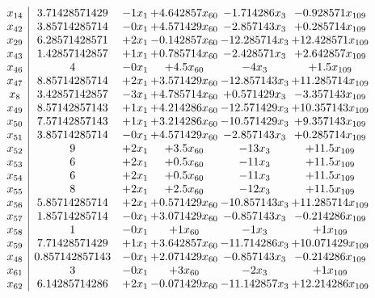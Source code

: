 \documentclass[11pt]{article}
\begin{document}
\[\begin{array}{c| c c@{\hskip 2pt} c@{\hskip 2pt} c@{\hskip 2pt} c@{\hskip 2pt} }
 x_{14}   &  3.71428571429 & -1 x_{1} & + 4.642857 x_{60} & -1.714286 x_{3} & -0.928571 x_{109}\\
 x_{42}   &  3.85714285714 & -0 x_{1} & + 4.571429 x_{60} & -2.857143 x_{3} & + 0.285714 x_{109}\\
 x_{29}   &  6.28571428571 & + 2 x_{1} & -0.142857 x_{60} & -12.285714 x_{3} & + 12.428571 x_{109}\\
 x_{43}   &  1.42857142857 & + 1 x_{1} & + 0.785714 x_{60} & -2.428571 x_{3} & + 2.642857 x_{109}\\
 x_{46}   &  4 & -0 x_{1} & + 4.5 x_{60} & -4 x_{3} & + 1.5 x_{109}\\
 x_{47}   &  8.85714285714 & + 2 x_{1} & + 3.571429 x_{60} & -12.857143 x_{3} & + 11.285714 x_{109}\\
 x_{8}   &  3.42857142857 & -3 x_{1} & + 4.785714 x_{60} & + 0.571429 x_{3} & -3.357143 x_{109}\\
 x_{49}   &  8.57142857143 & + 1 x_{1} & + 4.214286 x_{60} & -12.571429 x_{3} & + 10.357143 x_{109}\\
 x_{50}   &  7.57142857143 & + 1 x_{1} & + 3.214286 x_{60} & -10.571429 x_{3} & + 9.357143 x_{109}\\
 x_{51}   &  3.85714285714 & -0 x_{1} & + 4.571429 x_{60} & -2.857143 x_{3} & + 0.285714 x_{109}\\
 x_{52}   &  9 & + 2 x_{1} & + 3.5 x_{60} & -13 x_{3} & + 11.5 x_{109}\\
 x_{53}   &  6 & + 2 x_{1} & + 0.5 x_{60} & -11 x_{3} & + 11.5 x_{109}\\
 x_{54}   &  6 & + 2 x_{1} & + 0.5 x_{60} & -11 x_{3} & + 11.5 x_{109}\\
 x_{55}   &  8 & + 2 x_{1} & + 2.5 x_{60} & -12 x_{3} & + 11.5 x_{109}\\
 x_{56}   &  5.85714285714 & + 2 x_{1} & + 0.571429 x_{60} & -10.857143 x_{3} & + 11.285714 x_{109}\\
 x_{57}   &  1.85714285714 & -0 x_{1} & + 3.071429 x_{60} & -0.857143 x_{3} & -0.214286 x_{109}\\
 x_{58}   &  1 & -0 x_{1} & + 1 x_{60} & -1 x_{3} & + 1 x_{109}\\
 x_{59}   &  7.71428571429 & + 1 x_{1} & + 3.642857 x_{60} & -11.714286 x_{3} & + 10.071429 x_{109}\\
 x_{48}   &  0.857142857143 & -0 x_{1} & + 2.071429 x_{60} & -0.857143 x_{3} & -0.214286 x_{109}\\
 x_{61}   &  3 & -0 x_{1} & + 3 x_{60} & -2 x_{3} & + 1 x_{109}\\
 x_{62}   &  6.14285714286 & + 2 x_{1} & -0.071429 x_{60} & -11.142857 x_{3} & + 12.214286 x_{109}\\

\end{array}\]
\end{document}

